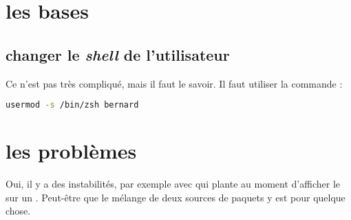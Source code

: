 \section{les bases}
\subsection{changer le \emph{shell} de l'utilisateur}
Ce n'est pas très compliqué, mais il faut le savoir. Il faut utiliser la commande  :

\begin{lstlisting}[language=sh, frame=single, caption=changer le shell par défaut]
usermod -s /bin/zsh bernard
\end{lstlisting}

\section{les problèmes}
Oui, il y a des instabilités, par exemple avec  qui plante au moment d'afficher le  sur un . Peut-être que le mélange de deux sources de paquets y est pour quelque chose.

